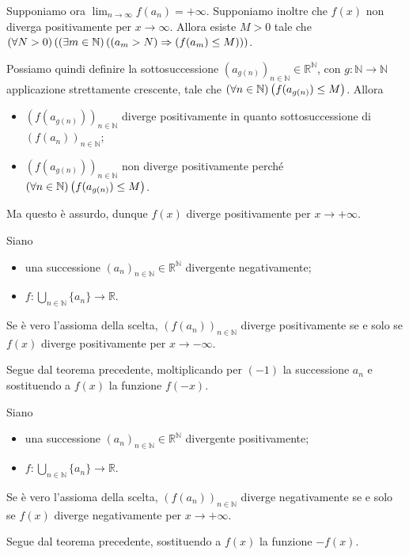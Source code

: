 \par Supponiamo ora $\lim_{n \rightarrow \infty} f(a_n) = +\infty$. Supponiamo inoltre che $f(x)$ non diverga positivamente per $x \rightarrow \infty$. Allora esiste $M > 0$ tale che $\left ( \forall N > 0 \right ) \left ( \left ( \exists m \in \mathbb{N} \right ) \left ( \left ( a_m > N \right ) \Rightarrow \left ( f(a_m) \leq M \right ) \right ) \right )$.
\par Possiamo quindi definire la sottosuccessione $(a_{g(n)})_{n \in \mathbb{N}} \in \mathbb{R}^{\mathbb{N}}$, con $g: \mathbb{N} \rightarrow \mathbb{N}$ applicazione strettamente crescente, tale che $\left ( \forall n \in \mathbb{N} \right ) \left ( f(a_{g(n)}) \leq M \right )$. Allora
\begin{itemize}
	\item $(f(a_{g(n)}))_{n \in \mathbb{N}}$ diverge positivamente in quanto sottosuccessione di $(f(a_n))_{n \in \mathbb{N}}$;
	\item $(f(a_{g(n)}))_{n \in \mathbb{N}}$ non diverge positivamente perch\'e $\left ( \forall n \in \mathbb{N} \right ) \left ( f(a_{g(n)}) \leq M \right )$.
\end{itemize}
Ma questo \`e assurdo, dunque $f(x)$ diverge positivamente per $x \rightarrow +\infty$. \EndProof
\begin{Corollary}
	Siano
	\begin{itemize}
		\item una successione $(a_n)_{n \in \mathbb{N}} \in \mathbb{R}^\mathbb{N}$ divergente negativamente;
		\item $f: \bigcup_{n \in \mathbb{N}} \lbrace a_n \rbrace \rightarrow \mathbb{R}$.
	\end{itemize}
	Se \`e vero l'assioma della scelta, $(f(a_n))_{n \in \mathbb{N}}$ diverge positivamente se e solo se $f(x)$ diverge positivamente per $x \rightarrow -\infty$.
\end{Corollary}
\Proof Segue dal teorema precedente, moltiplicando per $(-1)$ la successione $a_n$ e sostituendo a $f(x)$ la funzione $f(-x)$. \EndProof
\begin{Corollary}
	Siano
	\begin{itemize}
		\item una successione $(a_n)_{n \in \mathbb{N}} \in \mathbb{R}^\mathbb{N}$ divergente positivamente;
		\item $f: \bigcup_{n \in \mathbb{N}} \lbrace a_n \rbrace \rightarrow \mathbb{R}$.
	\end{itemize}
	Se \`e vero l'assioma della scelta, $(f(a_n))_{n \in \mathbb{N}}$ diverge negativamente se e solo se $f(x)$ diverge negativamente per $x \rightarrow +\infty$.
\end{Corollary}
\Proof Segue dal teorema precedente, sostituendo a $f(x)$ la funzione $-f(x)$. \EndProof
